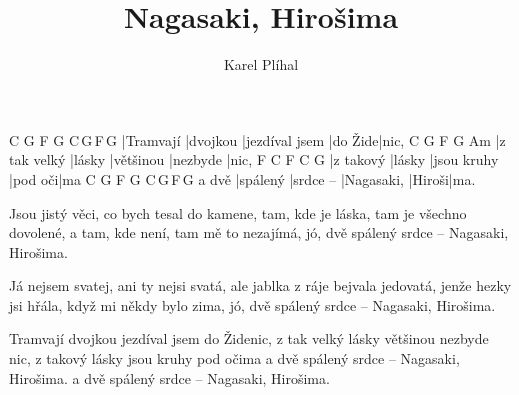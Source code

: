 \documentclass{song}
\title{Nagasaki, Hirošima}
\author{Karel Plíhal}
\begin{document}
\strophe
C         G        F              G       C\,G\,F\,G
|Tramvají |dvojkou |jezdíval jsem |do Žide|nic,
C            G      F         G        Am
|z tak velký |lásky |většinou |nezbyde |nic,
F         C      F           C       G
|z takový |lásky |jsou kruhy |pod oči|ma
      C        G         F          G      C\,G\,F\,G
a dvě |spálený |srdce -- |Nagasaki, |Hiroši|ma.
\endstrophe

\strophe*
Jsou jistý věci, co bych tesal do kamene,
tam, kde je láska, tam je všechno dovolené,
a tam, kde není, tam mě to nezajímá,
jó, dvě spálený srdce -- Nagasaki, Hirošima.
\endstrophe

\strophe*
Já nejsem svatej, ani ty nejsi svatá,
ale jablka z ráje bejvala jedovatá,
jenže hezky jsi hřála, když mi někdy bylo zima,
jó, dvě spálený srdce -- Nagasaki, Hirošima.
\endstrophe

\strophe*
Tramvají dvojkou jezdíval jsem do Židenic,
z tak velký lásky většinou nezbyde nic,
z takový lásky jsou kruhy pod očima
a dvě spálený srdce -- Nagasaki, Hirošima.
a dvě spálený srdce -- Nagasaki, Hirošima.
\endstrophe
\end{document}
